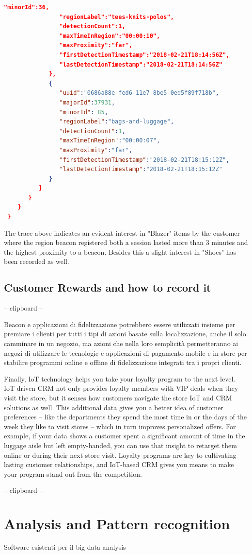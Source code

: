 \begin{lstlisting}[language=json,firstnumber=1]
                "minorId":36,
                "regionLabel":"tees-knits-polos",
                "detectionCount":1,
                "maxTimeInRegion":"00:00:10",
                "maxProximity":"far",
                "firstDetectionTimestamp":"2018-02-21T18:14:56Z",
                "lastDetectionTimestamp":"2018-02-21T18:14:56Z"
             },
             {
                "uuid":"0686a88e-fed6-11e7-8be5-0ed5f89f718b",
                "majorId":37931,
                "minorId": 85,
                "regionLabel":"bags-and-luggage",
                "detectionCount":1,
                "maxTimeInRegion":"00:00:07",
                "maxProximity":"far",
                "firstDetectionTimestamp":"2018-02-21T18:15:12Z",
                "lastDetectionTimestamp":"2018-02-21T18:15:12Z"
             }
          ]
       }
    }
 }
  \end{lstlisting}
\vspace{0.5cm}

The trace above indicates an evident interest in "Blazer" items by the customer where the region beacon registered both a session lasted more than 3 minutes and the highest proximity to a beacon. Besides this a slight interest in "Shoes" has been recorded as well.


\subsection{Customer Rewards and how to record it }


-- clipboard --

Beacon e applicazioni di fidelizzazione potrebbero essere utilizzati insieme per premiare i clienti per tutti i tipi di azioni basate sulla localizzazione, anche il solo camminare in un negozio, ma azioni che nella loro semplicità permetteranno ai negozi di utilizzare le tecnologie e applicazioni di pagamento mobile e in-store per stabilire programmi online e offline di fidelizzazione integrati tra i propri clienti.

Finally, IoT technology helps you take your loyalty program to the next level. IoT-driven CRM not only provides loyalty members with VIP deals when they visit the store, but it senses how customers navigate the store IoT and CRM solutions as well. This additional data gives you a better idea of customer preferences – like the departments they spend the most time in or the days of the week they like to visit stores – which in turn improves personalized offers. For example, if your data shows a customer spent a significant amount of time in the luggage aisle but left empty-handed, you can use that insight to retarget them online or during their next store visit. Loyalty programs are key to cultivating lasting customer relationships, and IoT-based CRM gives you means to make your program stand out from the competition.

-- clipboard --

\section{Analysis and Pattern recognition}

Software esistenti per il big data analysis



